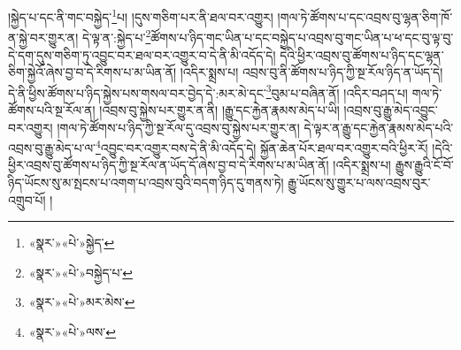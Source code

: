 །སྐྱེད་པ་དང་ནི་གང་བསྐྱེད་\footnote{«སྣར་»«པེ་»སྐྱེད་}པ། །དུས་གཅིག་པར་ནི་ཐལ་བར་འགྱུར། །གལ་ཏེ་ཚོགས་པ་དང་འབྲས་བུ་ལྷན་ཅིག་ཁོ་ན་སྐྱེ་བར་གྱུར་ན། དེ་ལྟ་ན་:སྐྱེད་པ་\footnote{«སྣར་»«པེ་»བསྐྱེད་པ་}ཚོགས་པ་ཉིད་གང་ཡིན་པ་དང་བསྐྱེད་པ་འབྲས་བུ་གང་ཡིན་པ་ཕ་དང་བུ་ལྟ་བུ་དེ་དག་དུས་གཅིག་ཏུ་འབྱུང་བར་ཐལ་བར་འགྱུར་བ་དེ་ནི་མི་འདོད་དེ། དེའི་ཕྱིར་འབྲས་བུ་ཚོགས་པ་ཉིད་དང་ལྷན་ཅིག་སྐྱེའོ་ཞེས་བྱ་བ་དེ་རིགས་པ་མ་ཡིན་ནོ། །འདིར་སྨྲས་པ། འབྲས་བུ་ནི་ཚོགས་པ་ཉིད་ཀྱི་སྔ་རོལ་ཉིད་ན་ཡོད་དེ། དེ་ནི་ཕྱིས་ཚོགས་པ་ཉིད་སྐྱེས་པས་གསལ་བར་བྱེད་དེ་:མར་མེ་དང་\footnote{«སྣར་»«པེ་»མར་མེས་}བུམ་པ་བཞིན་ནོ། །འདིར་བཤད་པ། གལ་ཏེ་ཚོགས་པའི་སྔ་རོལ་ན། །འབྲས་བུ་སྐྱེས་པར་གྱུར་ན་ནི། །རྒྱུ་དང་རྐྱེན་རྣམས་མེད་པ་ཡི། །འབྲས་བུ་རྒྱུ་མེད་འབྱུང་བར་འགྱུར། །གལ་ཏེ་ཚོགས་པ་ཉིད་ཀྱི་སྔ་རོལ་དུ་འབྲས་བུ་སྐྱེས་པར་གྱུར་ན། དེ་ལྟར་ན་རྒྱུ་དང་རྐྱེན་རྣམས་མེད་པའི་འབྲས་བུ་རྒྱུ་མེད་པ་ལ་\footnote{«སྣར་»«པེ་»ལས་}འབྱུང་བར་འགྱུར་བས་དེ་ནི་མི་འདོད་དེ། སྐྱོན་ཆེན་པོར་ཐལ་བར་འགྱུར་བའི་ཕྱིར་རོ། །དེའི་ཕྱིར་འབྲས་བུ་ཚོགས་པ་ཉིད་ཀྱི་སྔ་རོལ་ན་ཡོད་དོ་ཞེས་བྱ་བ་དེ་རིགས་པ་མ་ཡིན་ནོ། །འདིར་སྨྲས་པ། རྒྱུས་རྒྱུའི་ངོ་བོ་ཉིད་ཡོངས་སུ་མ་སྤངས་པ་འགག་པ་འབྲས་བུའི་བདག་ཉིད་དུ་གནས་ཏེ། རྒྱུ་ཡོངས་སུ་གྱུར་པ་ལས་འབྲས་བུར་འགྲུབ་པོ། །

